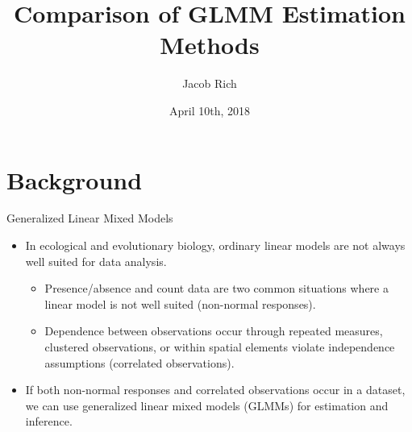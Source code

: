 \documentclass{beamer}\usepackage[]{graphicx}\usepackage[]{color}
\title{Comparison of GLMM Estimation Methods}
\author{Jacob Rich}
\date{April 10th, 2018}
\begin{document}
\begin{frame}
  \titlepage
\end{frame}




\section{Background}

\begin{frame}{Generalized Linear Mixed Models}
  \begin{itemize}
        \item In ecological and evolutionary biology, ordinary linear models are not always well suited for data analysis.
        \begin{itemize}
          \item Presence/absence and count data are two common situations where a linear model is not well suited (non-normal responses).
          \item Dependence between observations occur through repeated measures, clustered observations, or within spatial elements violate independence assumptions (correlated observations).
        \end{itemize}
        \item If both non-normal responses and correlated observations occur in a dataset, we can use generalized linear mixed models (GLMMs) for estimation and inference.
  \end{itemize}
\end{frame}
\end{document}
